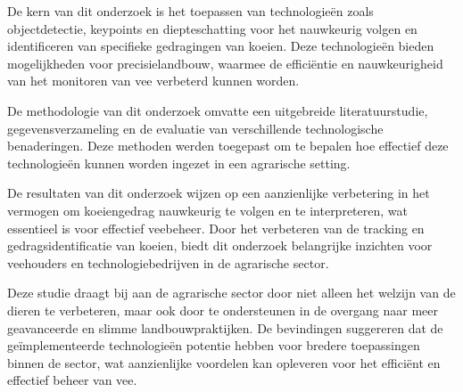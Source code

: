 De kern van dit onderzoek is het toepassen van technologieën zoals objectdetectie, keypoints en diepteschatting voor het nauwkeurig volgen en identificeren van specifieke gedragingen van koeien. Deze technologieën bieden mogelijkheden voor precisielandbouw, waarmee de efficiëntie en nauwkeurigheid van het monitoren van vee verbeterd kunnen worden.

De methodologie van dit onderzoek omvatte een uitgebreide literatuurstudie, gegevensverzameling en de evaluatie van verschillende technologische benaderingen. Deze methoden werden toegepast om te bepalen hoe effectief deze technologieën kunnen worden ingezet in een agrarische setting.

De resultaten van dit onderzoek wijzen op een aanzienlijke verbetering in het vermogen om koeiengedrag nauwkeurig te volgen en te interpreteren, wat essentieel is voor effectief veebeheer. Door het verbeteren van de tracking en gedragsidentificatie van koeien, biedt dit onderzoek belangrijke inzichten voor veehouders en technologiebedrijven in de agrarische sector.

Deze studie draagt bij aan de agrarische sector door niet alleen het welzijn van de dieren te verbeteren, maar ook door te ondersteunen in de overgang naar meer geavanceerde en slimme landbouwpraktijken. De bevindingen suggereren dat de geïmplementeerde technologieën potentie hebben voor bredere toepassingen binnen de sector, wat aanzienlijke voordelen kan opleveren voor het efficiënt en effectief beheer van vee.
